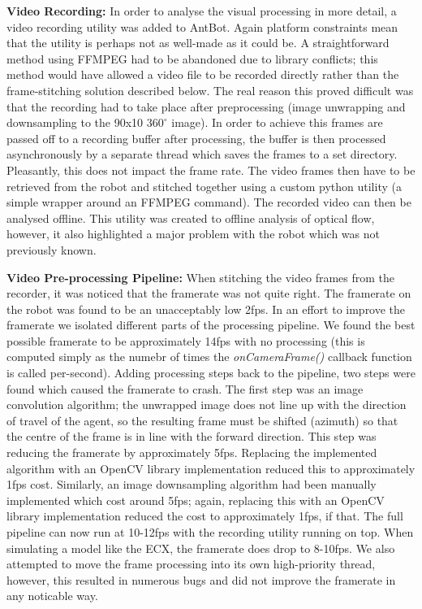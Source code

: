 \documentclass[a4paper,11pt,twoside,openright]{article}
\begin{document}
\textbf{Video Recording:}
In order to analyse the visual processing in more detail, a video recording
utility was added to AntBot. Again platform constraints mean that the utility
is perhaps not as well-made as it could be. A straightforward method using
FFMPEG had to be abandoned due to library conflicts; this method would
have allowed a video file to be recorded directly rather than the frame-stitching
solution described below. The real reason this proved difficult was that the
recording had to take place after preprocessing (image unwrapping and
downsampling to the 90x10 $360^{\circ}$ image). In order to achieve this frames
are passed off to a recording buffer after processing, the buffer is then
processed asynchronously by a separate thread which saves the frames to a
set directory. Pleasantly, this does not impact the frame rate. The video frames
then have to be retrieved from the robot and stitched together using a custom
python utility (a simple wrapper around an FFMPEG command). The recorded video
can then be analysed offline. This utility was created to offline analysis of
optical flow, however, it also highlighted a major problem with the robot which
was not previously known.
\newline
\par

\textbf{Video Pre-processing Pipeline:}
When stitching the video frames from the recorder, it was noticed that the
framerate was not quite right. The framerate on the robot was found to be
an unacceptably low 2fps. In an effort to improve the framerate we isolated
different parts of the processing pipeline. We found the best possible
framerate to be approximately 14fps with no processing (this is computed simply
as the numebr of times the \textit{onCameraFrame()} callback function is called
per-second). Adding processing steps back to the pipeline, two steps were found
which caused the framerate to crash. The first step was an image convolution
algorithm; the unwrapped image does not line up with the direction of travel of
the agent, so the resulting frame must be shifted (azimuth) so that the centre of
the frame is in line with the forward direction. This step was reducing the
framerate by approximately 5fps. Replacing the implemented algorithm with an
OpenCV library implementation reduced this to approximately 1fps cost. Similarly,
an image downsampling algorithm had been manually implemented which cost around
5fps; again, replacing this with an OpenCV library implementation reduced the
cost to approximately 1fps, if that. The full pipeline can now run at 10-12fps
with the recording utility running on top. When simulating a model like the ECX,
the framerate does drop to 8-10fps. We also attempted to move the frame
processing into its own high-priority thread, however, this resulted in numerous
bugs and did not improve the framerate in any noticable way.
\newline
\par
\end{document}
